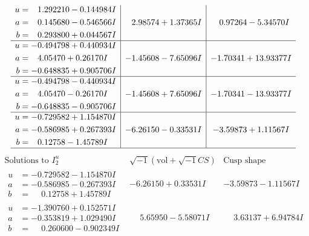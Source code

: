 \documentclass[1p]{elsarticle_modified}
\theoremstyle{definition}
\newcommand{\I}{\sqrt{-1}}
\begin{document}
$$\begin{array}{c|c|c}
\begin{aligned}
u &= \phantom{-}1.292210 - 0.144984 I \\
a &= \phantom{-}0.145680 - 0.546566 I \\
b &= \phantom{-}0.293800 + 0.044567 I\end{aligned}
 & \phantom{-}2.98574 + 1.37365 I & \phantom{-}0.97264 - 5.34570 I \\ \hline\begin{aligned}
u &= -0.494798 + 0.440934 I \\
a &= \phantom{-}4.05470 + 0.26170 I \\
b &= -0.648835 + 0.905706 I\end{aligned}
 & -1.45608 - 7.65096 I & -1.70341 + 13.93377 I \\ \hline\begin{aligned}
u &= -0.494798 - 0.440934 I \\
a &= \phantom{-}4.05470 - 0.26170 I \\
b &= -0.648835 - 0.905706 I\end{aligned}
 & -1.45608 + 7.65096 I & -1.70341 - 13.93377 I \\ \hline\begin{aligned}
u &= -0.729582 + 1.154870 I \\
a &= -0.586985 + 0.267393 I \\
b &= \phantom{-}0.12758 - 1.45789 I\end{aligned}
 & -6.26150 - 0.33531 I & -3.59873 + 1.11567 I\\
 \hline 
 \end{array}$$\newpage$$\begin{array}{c|c|c}  
\text{Solutions to }I^u_{2}& \I (\text{vol} + \sqrt{-1}CS) & \text{Cusp shape}\\
 \hline 
\begin{aligned}
u &= -0.729582 - 1.154870 I \\
a &= -0.586985 - 0.267393 I \\
b &= \phantom{-}0.12758 + 1.45789 I\end{aligned}
 & -6.26150 + 0.33531 I & -3.59873 - 1.11567 I \\ \hline\begin{aligned}
u &= -1.390760 + 0.152571 I \\
a &= -0.353819 + 1.029490 I \\
b &= \phantom{-}0.260600 - 0.902349 I\end{aligned}
 & \phantom{-}5.65950 - 5.58071 I & \phantom{-}3.63137 + 6.94784 I \\ \hline\begin{aligned}

\end{aligned}
\end{array}$$
\end{document}
